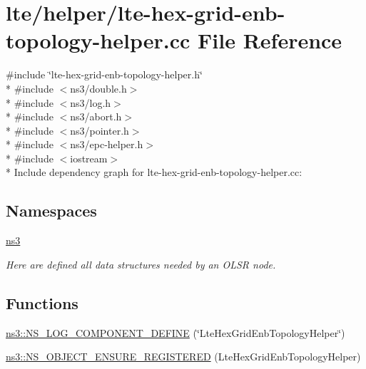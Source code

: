 \hypertarget{lte-hex-grid-enb-topology-helper_8cc}{}\section{lte/helper/lte-\/hex-\/grid-\/enb-\/topology-\/helper.cc File Reference}
\label{lte-hex-grid-enb-topology-helper_8cc}
{\ttfamily \#include \char`\"{}lte-\/hex-\/grid-\/enb-\/topology-\/helper.\+h\char`\"{}}\\*
{\ttfamily \#include $<$ns3/double.\+h$>$}\\*
{\ttfamily \#include $<$ns3/log.\+h$>$}\\*
{\ttfamily \#include $<$ns3/abort.\+h$>$}\\*
{\ttfamily \#include $<$ns3/pointer.\+h$>$}\\*
{\ttfamily \#include $<$ns3/epc-\/helper.\+h$>$}\\*
{\ttfamily \#include $<$iostream$>$}\\*
Include dependency graph for lte-\/hex-\/grid-\/enb-\/topology-\/helper.cc\+:
\subsection*{Namespaces}
\begin{DoxyCompactItemize}
\item 
 \hyperlink{namespacens3}{ns3}
\begin{DoxyCompactList}\small\item\em Here are defined all data structures needed by an O\+L\+SR node. \end{DoxyCompactList}\end{DoxyCompactItemize}
\subsection*{Functions}
\begin{DoxyCompactItemize}
\item 
\hyperlink{namespacens3_a6b59bf2987ecb67b89bea5b28e3e5caa}{ns3\+::\+N\+S\+\_\+\+L\+O\+G\+\_\+\+C\+O\+M\+P\+O\+N\+E\+N\+T\+\_\+\+D\+E\+F\+I\+NE} (\char`\"{}Lte\+Hex\+Grid\+Enb\+Topology\+Helper\char`\"{})
\item 
\hyperlink{namespacens3_a41e43bdc7c1fd803083c84875865dee0}{ns3\+::\+N\+S\+\_\+\+O\+B\+J\+E\+C\+T\+\_\+\+E\+N\+S\+U\+R\+E\+\_\+\+R\+E\+G\+I\+S\+T\+E\+R\+ED} (Lte\+Hex\+Grid\+Enb\+Topology\+Helper)
\end{DoxyCompactItemize}
